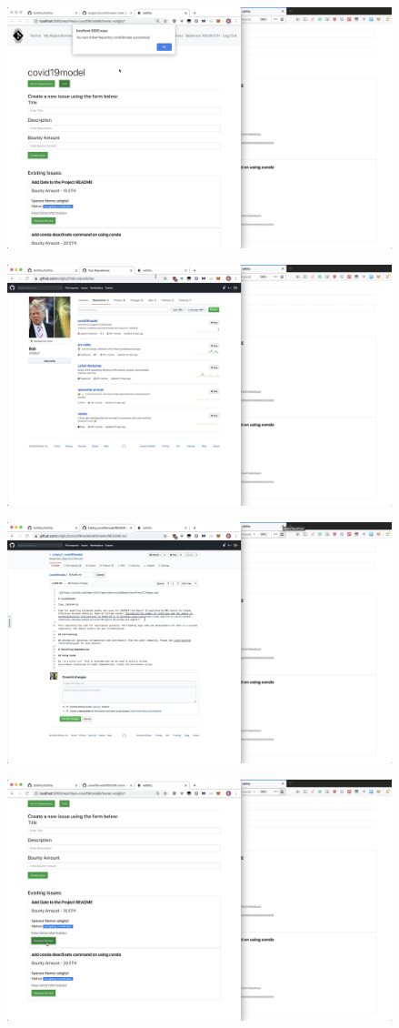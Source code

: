 \documentclass[12pt]{article}
\renewcommand{\_}{\kern-1.5pt\textunderscore\kern-1.5pt}
\begin{document}
\includegraphics[height=7cm]{graphs/31. bob_fork_project}

\includegraphics[height=7cm]{graphs/32. bob_forked_github}

\includegraphics[height=7cm]{graphs/33. bob_make_changes}

\includegraphics[height=7cm]{graphs/34. bob_review_request}
\end{document}
